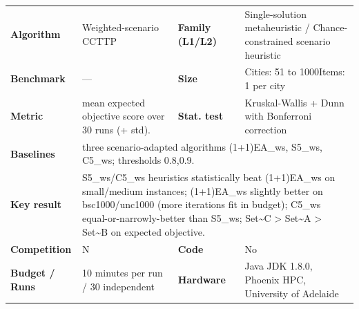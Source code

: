 \documentclass[
  a4paper,
  11pt,
  headings=small,
  numbers=noenddot,
  abstract=on,
  parskip=half,
]{scrartcl}
\begin{document}
\begin{landscape}
\begin{longtable}{@{}p{2.6cm}p{8.7cm}p{2.6cm}p{8.7cm}@{}}
\textbf{Algorithm} & Weighted-scenario CCTTP & \textbf{Family (L1/L2)} & Single-solution metaheuristic / Chance-constrained scenario heuristic \\
\textbf{Benchmark} & --- & \textbf{Size} & Cities: 51 to 1000\newline Items: 1 per city \\
\textbf{Metric} & mean expected objective score over 30 runs (+ std). & \textbf{Stat. test} & Kruskal-Wallis + Dunn with Bonferroni correction \\
\textbf{Baselines} & \multicolumn{3}{p{20.0cm}}{three scenario-adapted algorithms (1+1)EA\_ws, S5\_ws, C5\_ws; thresholds 0.8,0.9.} \\
\textbf{Key result} & \multicolumn{3}{p{20.0cm}}{S5\_ws/C5\_ws heuristics statistically beat (1+1)EA\_ws on small/medium instances; (1+1)EA\_ws slightly better on bsc1000/unc1000 (more iterations fit in budget); C5\_ws equal-or-narrowly-better than S5\_ws; Set\textasciitilde{}C > Set\textasciitilde{}A > Set\textasciitilde{}B on expected objective.} \\
\textbf{Competition} & N & \textbf{Code} & No \\
\textbf{Budget / Runs} & 10 minutes per run / 30 independent & \textbf{Hardware} & Java JDK 1.8.0, Phoenix HPC, University of Adelaide \\

\end{longtable}
\end{landscape}
\end{document}

